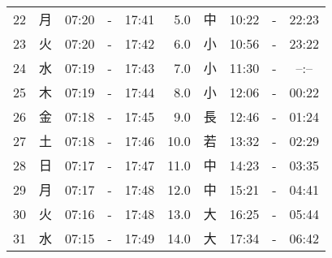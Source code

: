 \documentclass[a4j,10pt]{jsarticle}
\begin{document}
\begin{center}
\begin{table}[ht]
\begin{center}
\begin{tabular}{|rc|ccc|rc|ccc|}
 22 & 月 & 07:20 &-& 17:41 &  5.0 & 中 & 10:22 &-& 22:23 \\
 23 & 火 & 07:20 &-& 17:42 &  6.0 & 小 & 10:56 &-& 23:22 \\
 24 & 水 & 07:19 &-& 17:43 &  7.0 & 小 & 11:30 &-& --:-- \\
 25 & 木 & 07:19 &-& 17:44 &  8.0 & 小 & 12:06 &-& 00:22 \\
 26 & 金 & 07:18 &-& 17:45 &  9.0 & 長 & 12:46 &-& 01:24 \\
 27 & 土 & 07:18 &-& 17:46 & 10.0 & 若 & 13:32 &-& 02:29 \\
 28 & 日 & 07:17 &-& 17:47 & 11.0 & 中 & 14:23 &-& 03:35 \\
 29 & 月 & 07:17 &-& 17:48 & 12.0 & 中 & 15:21 &-& 04:41 \\
 30 & 火 & 07:16 &-& 17:48 & 13.0 & 大 & 16:25 &-& 05:44 \\
 31 & 水 & 07:15 &-& 17:49 & 14.0 & 大 & 17:34 &-& 06:42 \\
\hline
\end{tabular}
\end{center}
\end{table}
\newpage
\end{center}
\end{document}
